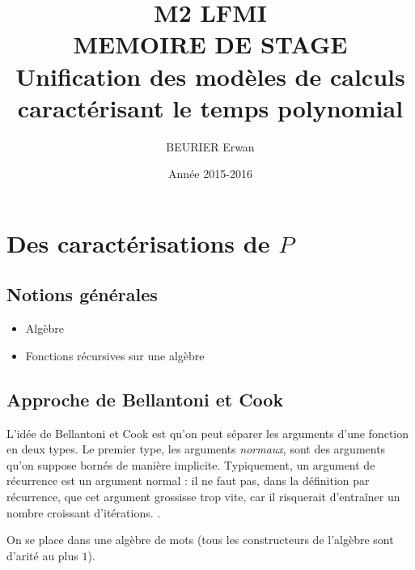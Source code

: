 \documentclass{article}
\author{BEURIER Erwan}
\title{M2 LFMI \\ MEMOIRE DE STAGE \\ Unification des modèles de calculs caractérisant le temps polynomial}
\date{Année 2015-2016}
\begin{document}
	\maketitle
	
	\tableofcontents
	
	\pagebreak
	
	
	\section{Des caractérisations de $P$}
	
	
		\subsection{Notions générales}
		
		
		\begin{itemize}[itemsep=-1mm]
			\item 	Algèbre
			\item 	Fonctions récursives sur une algèbre
		\end{itemize}
		
		
		\subsection{Approche de Bellantoni et Cook}
		
		
		
		L'idée de Bellantoni et Cook est qu'on peut séparer les arguments d'une fonction en deux types. Le premier type, les arguments \emph{normaux}, sont des arguments qu'on suppose bornés de manière implicite. Typiquement, un argument de récurrence est un argument normal : il ne faut pas, dans la définition par récurrence, que cet argument grossisse trop vite, car il risquerait d'entraîner un nombre croissant d'itérations. .
		
		On se place dans une algèbre de mots (tous les constructeurs de l'algèbre sont d'arité au plus $1$).
		
\end{document}

